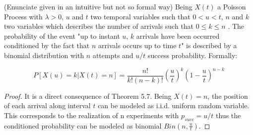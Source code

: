 \begin{theorem}
  (Enunciate given in an intuitive but not so formal way)
  \newline
  Being $X(t)$ a Poisson Process with $\lambda>0$, $u$ and $t$ two temporal variables such that $0<u<t$, $n$ and $k$ two variables which describes the number of arrivals such that $0\leq k\leq n$ . The probability of the event  "up to instant $u$, $k$ arrivals have been occurred conditioned by the fact that $n$ arrivals occurs up to time $t$" is described by a binomial distribution with $n$ attempts and $u/t$ success probability.
  Formally: 
  
  \begin{equation}            
  P[X(u)=k|X(t)=n]= \frac{n!}{k!(n-k)!}(\frac{u}{t})^k(1-\frac{u}{t})^{n-k}
  \end{equation}
  \begin{proof}
  	It is a direct consequence of Theorem 5.7.
  	Being $X(t)=n$, the position of each arrival along interval $t$ can be modeled as i.i.d. uniform random variable. This corresponds to the realization of n experiments with  $p_{succ}=u/t$  thus the conditioned probability can be modeled as binomial $Bin(n,\frac{u}{t})$.  
  \end{proof}
	
\end{theorem}



  
